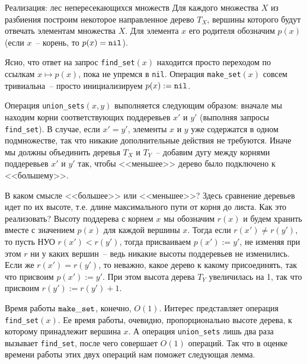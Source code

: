 \begin{algodescription}{Реализация: лес непересекающихся множеств}
    Для каждого множества $X$ из разбиения построим некоторое направленное дерево $T_X$, вершины которого будут отвечать элементам множества $X$. Для элемента $x$ его родителя обозначим $p(x)$ (если $x$~-- корень, то $p(x) = {\tt nil}$).

    Ясно, что ответ на запрос {\tt find\_set}$(x)$ находится просто переходом по ссылкам $x \mapsto p(x)$, пока не упремся в {\tt nil}. Операция {\tt make\_set}$(x)$ совсем тривиальна~-- просто инициализируем $p(x) := {\tt nil}$.

    Операция {\tt union\_sets}$(x, y)$ выполняется следующим образом: вначале мы находим корни соответствующих поддеревьев $x'$ и $y'$ (выполняя запросы {\tt find\_set}). В случае, если $x' = y'$, элементы $x$ и $y$ уже содержатся в одном подмножестве, так что никакие дополнительные действия не требуются. Иначе мы должны объединить деревья $T_X$ и $T_Y$~-- добавим дугу между корнями поддеревьев $x'$ и $y'$ так, чтобы <<меньшее>> дерево было подключено к <<большему>>.

    В каком смысле <<большее>> или <<меньшее>>? Здесь сравнение деревьев идет по их высоте, т.е. длине максимального пути от корня до листа. Как это реализовать? Высоту поддерева с корнем $x$ мы обозначим $r(x)$ и будем хранить вместе с значением $p(x)$ для каждой вершины $x$. Тогда если $r(x') \neq r(y')$, то пусть НУО $r(x') < r(y')$, тогда присваиваем $p(x') := y'$, не изменяя при этом $r$ ни у каких вершин~-- ведь никакие высоты поддеревьев не изменились. Если же $r(x') = r(y')$, то неважно, какое дерево к какому присоединять, так что присвоим $p(x') := y'$. При этом высота дерева $T_Y$ увеличилась на 1, так что присвоим $r(y') := r(y') + 1$.
\end{algodescription}

Время работы ${\tt make\_set}$, конечно, $O(1)$. Интерес представляет операция {\tt find\_set}$(x)$. Ее время работы, очевидно, пропорционально высоте дерева, к которому принадлежит вершина $x$. А операция {\tt union\_sets} лишь два раза вызывает {\tt find\_set}, после чего совершает $O(1)$ операций. Так что в оценке времени работы этих двух операций нам поможет следующая лемма.

